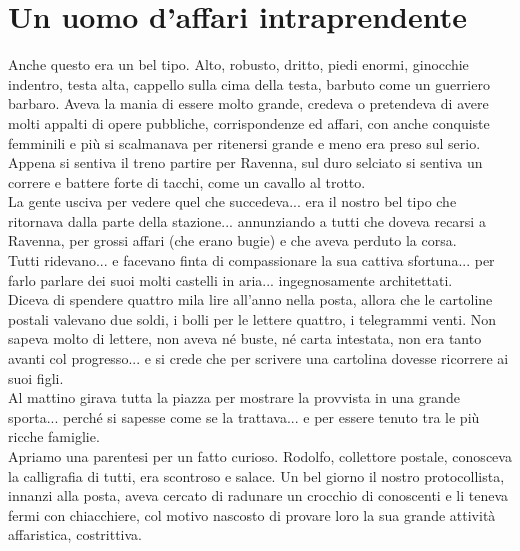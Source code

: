 
\chapter{Un uomo d'affari intraprendente}
Anche questo era un bel tipo. Alto, robusto, dritto, piedi enormi, ginocchie indentro, testa alta, cappello sulla cima della testa, barbuto come un guerriero barbaro. Aveva la mania di essere molto grande, credeva o pretendeva di avere molti appalti di opere pubbliche, corrispondenze ed affari, con anche conquiste femminili e più si scalmanava per ritenersi grande e meno era preso sul serio.\\
\indent Appena si sentiva il treno partire per Ravenna, sul duro selciato si sentiva un correre e battere forte di tacchi, come un cavallo al trotto.\\
\indent La gente usciva per vedere quel che succedeva... era il nostro bel tipo che ritornava dalla parte della stazione... annunziando a tutti che doveva recarsi a Ravenna, per grossi affari (che erano bugie) e che aveva perduto la corsa.\\
\indent Tutti ridevano... e facevano finta di compassionare la sua cattiva sfortuna... per farlo parlare dei suoi molti castelli in aria... ingegnosamente architettati.\\
\indent Diceva di spendere quattro mila lire all'anno nella posta, allora che le cartoline postali valevano due soldi, i bolli per le lettere quattro, i telegrammi venti. Non sapeva molto di lettere, non aveva né buste, né carta intestata, non era tanto avanti col progresso... e si crede che per scrivere una cartolina dovesse ricorrere ai suoi figli. \\
\indent Al mattino girava tutta la piazza per mostrare la provvista in una grande sporta... perché si sapesse come se la trattava... e per essere tenuto tra le più ricche famiglie.\\
\indent Apriamo una parentesi per un fatto curioso. Rodolfo, collettore postale, conosceva la calligrafia di tutti, era scontroso e salace. Un bel giorno il nostro protocollista, innanzi alla posta, aveva cercato di radunare un crocchio di conoscenti e li teneva fermi con chiacchiere, col motivo nascosto di provare loro la sua grande attività affaristica, costrittiva. \\
